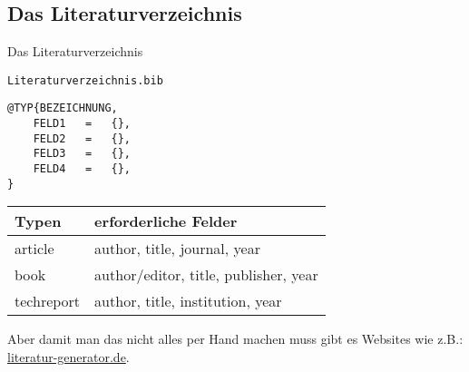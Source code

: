 \documentclass["WS\space 16-17\space -\space LaTeX-Kurs\space -\space Praesentation\space -\space 3.tex"]{subfiles}
\begin{document}
\subsection{Das Literaturverzeichnis}
\begin{frame}[c]
	\begin{center}
		\large Das Literaturverzeichnis
	\end{center}
\end{frame}
\begin{frame}[fragile]
	\begin{lstlisting}
Literaturverzeichnis.bib
	\end{lstlisting}
	\begin{lstlisting}
@TYP{BEZEICHNUNG,
	FELD1	=	{},
	FELD2	=	{},
	FELD3	=	{},
	FELD4	=	{},
}
	\end{lstlisting}
	\begin{center}
		\begin{tabular}{ll}
			\toprule					
			Typen			&	erforderliche Felder						\\ \midrule
			article			&	author, title, journal, year				\\	
			book			&	author/editor, title, publisher, year		\\
			techreport		&	author, title, institution, year			\\
			\bottomrule
		\end{tabular}
	\end{center}
	\vspace{0.1cm}
\end{frame}
\begin{frame}
	Aber damit man das nicht alles per Hand machen muss gibt es Websites wie z.B.:
	\href{http://literatur-generator.de}{\textrm{literatur-generator.de}}.
\end{frame}
\end{document}
